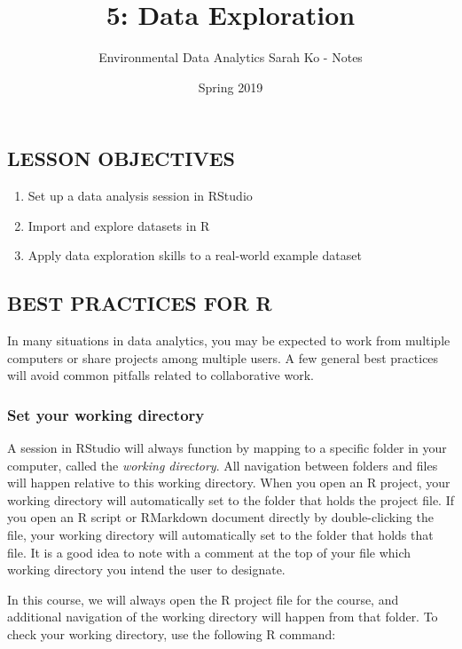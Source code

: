 \documentclass[]{article}
\title{5: Data Exploration}
\author{Environmental Data Analytics \textbar{} Sarah Ko - Notes}
\date{Spring 2019}
\providecommand{\tightlist}{%
  \setlength{\itemsep}{0pt}\setlength{\parskip}{0pt}}
\begin{document}
\maketitle

\subsection{LESSON OBJECTIVES}\label{lesson-objectives}

\begin{enumerate}
\def\labelenumi{\arabic{enumi}.}
\tightlist
\item
  Set up a data analysis session in RStudio
\item
  Import and explore datasets in R
\item
  Apply data exploration skills to a real-world example dataset
\end{enumerate}

\subsection{BEST PRACTICES FOR R}\label{best-practices-for-r}

In many situations in data analytics, you may be expected to work from
multiple computers or share projects among multiple users. A few general
best practices will avoid common pitfalls related to collaborative work.

\subsubsection{Set your working
directory}\label{set-your-working-directory}

A session in RStudio will always function by mapping to a specific
folder in your computer, called the \emph{working directory}. All
navigation between folders and files will happen relative to this
working directory. When you open an R project, your working directory
will automatically set to the folder that holds the project file. If you
open an R script or RMarkdown document directly by double-clicking the
file, your working directory will automatically set to the folder that
holds that file. It is a good idea to note with a comment at the top of
your file which working directory you intend the user to designate.

In this course, we will always open the R project file for the course,
and additional navigation of the working directory will happen from that
folder. To check your working directory, use the following R command:
\end{document}
